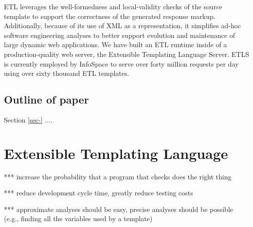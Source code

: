 \documentclass{www2003-submission}
\begin{document}
ETL leverages the well-formedness and local-validity checks of the
source template to support the correctness of the generated response
markup.  Additionally, because of its use of XML as a representation,
it simplifies ad-hoc software engineering analyses to better support
evolution and maintenance of large dynamic web applications.  We have
built an ETL runtime inside of a production-quality web server, the
Extensible Templating Language Server.  ETLS is currently employed by
InfoSpace to serve over forty million requests per day using over
sixty thousand ETL templates.

\subsection{Outline of paper}

Section \ref{sec-} ....







\section{Extensible Templating Language}


*** increase the probability that a program that checks does the right thing

*** reduce development cycle time, greatly reduce testing costs

*** approximate analyses should be easy, precise analyses should be possible
    (e.g., finding all the variables used by a template)
\end{document}
